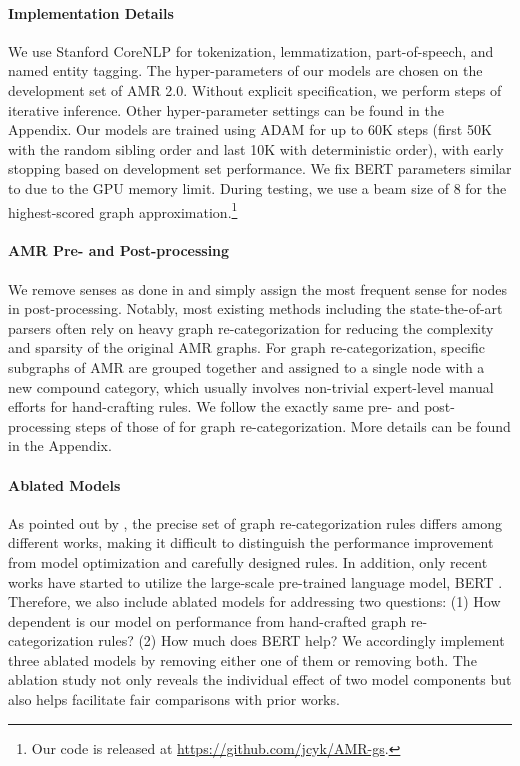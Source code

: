 \documentclass[11pt,a4paper]{article}
\begin{document}
	\paragraph{Implementation Details } We use Stanford CoreNLP \cite{manning2014stanford} for tokenization, lemmatization, part-of-speech, and named entity tagging. The hyper-parameters of our models are chosen on the development set of AMR 2.0. Without explicit specification, we perform  steps of iterative inference. Other hyper-parameter settings can be found in the Appendix. Our models are trained using ADAM \cite{kingma2014adam} for up to 60K steps (first 50K with the random sibling order and last 10K with deterministic order), with early stopping based on development set performance. We fix BERT parameters similar to  due to the GPU memory limit. During testing, we use a beam size of 8 for the highest-scored graph approximation.\footnote{Our code is released at \url{https://github.com/jcyk/AMR-gs}.}
	\paragraph{AMR Pre- and Post-processing} We remove senses as done in  and simply assign the most frequent sense for nodes in post-processing. Notably, most existing methods including the state-the-of-art parsers \cite[][inter alia]{zhang-etal-2019-amr,zhang-etal-2019-broad,lyu2018amr,guo2018better} often rely on heavy graph re-categorization for reducing the complexity and sparsity of the original AMR graphs. For graph re-categorization, specific subgraphs of AMR are grouped together and assigned to a single node with a new compound category, which usually involves non-trivial expert-level manual efforts for hand-crafting rules. We follow the exactly same pre- and post-processing steps of those of  for graph re-categorization. More details can be found in the Appendix.
	\paragraph{Ablated Models}
	As pointed out by , the precise set of graph re-categorization rules differs among different works, making it difficult to distinguish the performance improvement from model optimization and carefully designed rules. In addition, only recent works \cite{zhang-etal-2019-amr,zhang-etal-2019-broad,lindemann-etal-2019-compositional,naseem-etal-2019-rewarding} have started to utilize the large-scale pre-trained language model, BERT \cite{devlin-etal-2019-bert,Wolf2019HuggingFacesTS}. Therefore, we also include ablated models for addressing two questions: (1) How dependent is our model on performance from hand-crafted graph re-categorization rules? (2) How much does BERT help? We accordingly implement three ablated models by removing either one of them or removing both. The ablation study not only reveals the individual effect of two model components but also helps facilitate fair comparisons with prior works.
\end{document}
